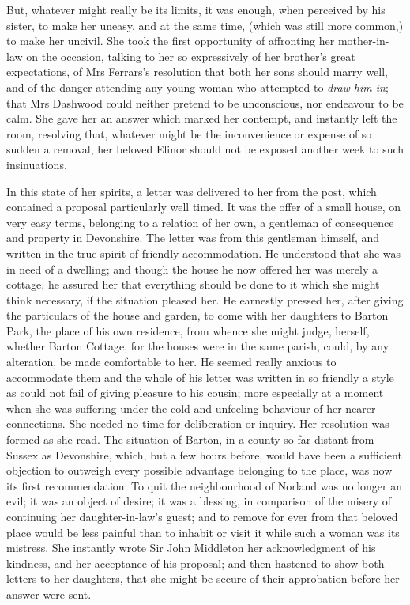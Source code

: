 But, whatever might really be its limits, it was enough, when perceived by his sister, to make her uneasy, and at the same time, (which was still more common,) to make her uncivil. She took the first opportunity of affronting her mother-in-law on the occasion, talking to her so expressively of her brother’s great expectations, of Mrs Ferrars’s resolution that both her sons should marry well, and of the danger attending any young woman who attempted to \textit{draw him in}; that Mrs Dashwood could neither pretend to be unconscious, nor endeavour to be calm. She gave her an answer which marked her contempt, and instantly left the room, resolving that, whatever might be the inconvenience or expense of so sudden a removal, her beloved Elinor should not be exposed another week to such insinuations.

In this state of her spirits, a letter was delivered to her from the post, which contained a proposal particularly well timed. It was the offer of a small house, on very easy terms, belonging to a relation of her own, a gentleman of consequence and property in Devonshire. The letter was from this gentleman himself, and written in the true spirit of friendly accommodation. He understood that she was in need of a dwelling; and though the house he now offered her was merely a cottage, he assured her that everything should be done to it which she might think necessary, if the situation pleased her. He earnestly pressed her, after giving the particulars of the house and garden, to come with her daughters to Barton Park, the place of his own residence, from whence she might judge, herself, whether Barton Cottage, for the houses were in the same parish, could, by any alteration, be made comfortable to her. He seemed really anxious to accommodate them and the whole of his letter was written in so friendly a style as could not fail of giving pleasure to his cousin; more especially at a moment when she was suffering under the cold and unfeeling behaviour of her nearer connections. She needed no time for deliberation or inquiry. Her resolution was formed as she read. The situation of Barton, in a county so far distant from Sussex as Devonshire, which, but a few hours before, would have been a sufficient objection to outweigh every possible advantage belonging to the place, was now its first recommendation. To quit the neighbourhood of Norland was no longer an evil; it was an object of desire; it was a blessing, in comparison of the misery of continuing her daughter-in-law’s guest; and to remove for ever from that beloved place would be less painful than to inhabit or visit it while such a woman was its mistress. She instantly wrote Sir John Middleton her acknowledgment of his kindness, and her acceptance of his proposal; and then hastened to show both letters to her daughters, that she might be secure of their approbation before her answer were sent.

